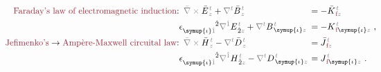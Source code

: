 \begin{subequations} \label{eq:Curl-EH}
	\abovedisplayskip=-8pt
\begin{align}
	\hspace{-2.6em}\textcolor{Maroon}{\text{Faraday's law of electromagnetic induction}}\text{:}&\hspace{0.5em} \mathcolor{gray}{\bar{\nabla} \times} \bar{E}^{\;\!\mathcolor{gray}{t}}_{\;\!\mathcolor{gray}{z}} + \mathcolor{gray}{\nabla^t} \bar{B}^{\;\!\mathcolor{gray}{t}}_{\;\!\mathcolor{gray}{z}} \hspace{-0.9em} &&= - \bar{K}^{\;\!\mathcolor{gray}{t}}_{\;\!\textcolor{Maroon}{\text{f}}\mathcolor{gray}{z}} \label{eq:Curl-EK} \\
	\hspace{-2.6em}&\epsilon^{\hphantom{\symup{\iota}\hat{1}}\hat{2}}_{\symup{\iota}\mathcolor{gray}{\hat{1}}} \mathcolor{gray}{\nabla^{\hat{1}}} E^{\;\!\mathcolor{gray}{t}}_{\;\! \hat{2}\mathcolor{gray}{z}} + \mathcolor{gray}{\nabla^t} B^{\;\!\mathcolor{gray}{t}}_{\;\! \symup{\iota}\mathcolor{gray}{z}} \hspace{-0.9em} &&= - {K}^{\;\!\mathcolor{gray}{t}}_{\;\! \textcolor{Maroon}{\text{f}} \symup{\iota}\mathcolor{gray}{z}}~, \label{eq:curl-EK} \\
	\hspace{-2.6em}\textcolor{Maroon}{\text{Jefimenko's}} \to \textcolor{Maroon}{\text{Amp\`{e}re-Maxwell circuital law}}\text{:}&\hspace{0.5em} \mathcolor{gray}{\bar{\nabla} \times} \bar{H}^{\;\!\mathcolor{gray}{t}}_{\;\!\mathcolor{gray}{z}} - \mathcolor{gray}{\nabla^t} \bar{D}^{\;\!\mathcolor{gray}{t}}_{\;\!\mathcolor{gray}{z}} \hspace{-0.9em} &&= \bar{J}^{\;\!\mathcolor{gray}{t}}_{\;\!\textcolor{Maroon}{\text{f}}\mathcolor{gray}{z}} \label{eq:Curl-H} \\
	\hspace{-2.6em}&\epsilon^{\hphantom{\symup{\iota}\hat{1}}\hat{2}}_{\symup{\iota}\mathcolor{gray}{\hat{1}}} \mathcolor{gray}{\nabla^{\hat{1}}} H^{\;\!\mathcolor{gray}{t}}_{\;\! \hat{2}\mathcolor{gray}{z}} - \mathcolor{gray}{\nabla^t} D^{\;\!\mathcolor{gray}{t}}_{\;\! \symup{\iota}\mathcolor{gray}{z}} \hspace{-0.9em} &&= J^{\;\!\mathcolor{gray}{t}}_{\;\! \textcolor{Maroon}{\text{f}} \symup{\iota}\mathcolor{gray}{z}}~. \label{eq:curl-H}
\end{align}
\end{subequations}
